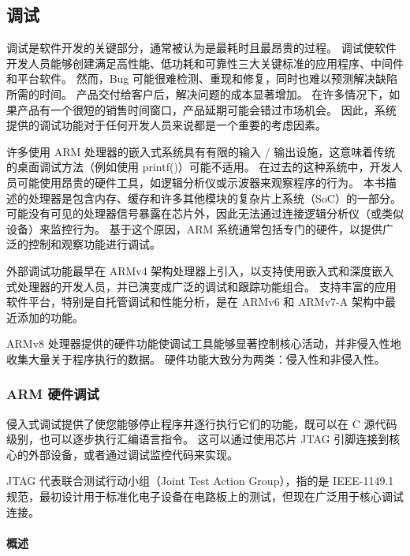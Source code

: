 \subsection{调试}

调试是软件开发的关键部分，通常被认为是最耗时且最昂贵的过程。
调试使软件开发人员能够创建满足高性能、低功耗和可靠性三大关键标准的应用程序、中间件和平台软件。
然而，Bug 可能很难检测、重现和修复，同时也难以预测解决缺陷所需的时间。
产品交付给客户后，解决问题的成本显著增加。
在许多情况下，如果产品有一个很短的销售时间窗口，产品延期可能会错过市场机会。
因此，系统提供的调试功能对于任何开发人员来说都是一个重要的考虑因素。

许多使用 ARM 处理器的嵌入式系统具有有限的输入 / 输出设施，这意味着传统的桌面调试方法（例如使用 printf()）可能不适用。
在过去的这种系统中，开发人员可能使用昂贵的硬件工具，如逻辑分析仪或示波器来观察程序的行为。
本书描述的处理器是包含内存、缓存和许多其他模块的复杂片上系统（SoC）的一部分。
可能没有可见的处理器信号暴露在芯片外，因此无法通过连接逻辑分析仪（或类似设备）来监控行为。
基于这个原因，ARM 系统通常包括专门的硬件，以提供广泛的控制和观察功能进行调试。

外部调试功能最早在 ARMv4 架构处理器上引入，以支持使用嵌入式和深度嵌入式处理器的开发人员，并已演变成广泛的调试和跟踪功能组合。
支持丰富的应用软件平台，特别是自托管调试和性能分析，是在 ARMv6 和 ARMv7-A 架构中最近添加的功能。

ARMv8 处理器提供的硬件功能使调试工具能够显著控制核心活动，并非侵入性地收集大量关于程序执行的数据。
硬件功能大致分为两类：侵入性和非侵入性。

\subsubsection{ARM 硬件调试}

侵入式调试提供了使您能够停止程序并逐行执行它们的功能，既可以在 C 源代码级别，也可以逐步执行汇编语言指令。
这可以通过使用芯片 JTAG 引脚连接到核心的外部设备，或者通过调试监控代码来实现。

\begin{Tcbox}[title={注意}]
  JTAG 代表联合测试行动小组（Joint Test Action Group），指的是 IEEE-1149.1 规范，最初设计用于标准化电子设备在电路板上的测试，但现在广泛用于核心调试连接。
\end{Tcbox}

\paragraph*{概述}

